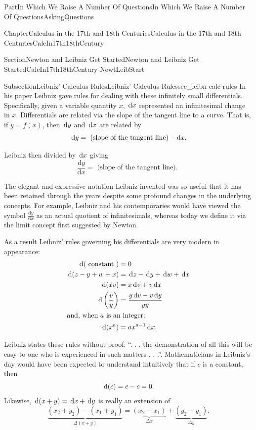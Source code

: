 \documentclass[oneside,10pt,]{book}
\numberwithin{equation}{part}
\newcommand{\dx}[1]{\,{\rm d}#1}
\newcommand{\dfdx}[2]{\frac{\text{d}{#1}}{\text{d}{#2}}}
\newcommand{\amp}{&}
\begin{document}
\begin{partptx}{Part}{In Which We Raise A Number Of Questions}{}{In Which We Raise A Number Of Questions}{}{}{AskingQuestions}
\begin{chapterptx}{Chapter}{Calculus in the 17th and 18th Centuries}{}{Calculus in the 17th and 18th Centuries}{}{}{CalcIn17th18thCentury}
\begin{sectionptx}{Section}{Newton and Leibniz Get Started}{}{Newton and Leibniz Get Started}{}{}{CalcIn17th18thCentury-NewtLeibStart}
\begin{subsectionptx}{Subsection}{Leibniz' Calculus Rules}{}{Leibniz' Calculus Rules}{}{}{sec_leibn-calc-rules}
In his paper Leibniz gave rules for dealing with these infinitely small differentials.  Specifically, given a variable quantity \(x\), \(\dx{x}\) represented an infinitesimal change in \(x\).  Differentials are related via the slope of the tangent line to a curve.  That is, if \(y=f(x)\), then \(\dx{ y}\) and \(\dx{ x}\) are related by%
\begin{equation*}
\dx{ y}=\text{ (slope of the tangent line) } \cdot \dx{ x}\text{.}
\end{equation*}
%
\par
Leibniz then divided by \(\dx{ x}\) giving%
\begin{equation*}
\dfdx{y}{x}= \text{ (slope of the tangent line). }
\end{equation*}
%
\par
{} The elegant and expressive notation Leibniz invented was so useful that it has been retained through the years despite some profound changes in the underlying concepts.  For example, Leibniz and his contemporaries would have viewed the symbol \(\dfdx{y}{x}\) as an actual quotient of infinitesimals, whereas today we define it via the limit concept first suggested by Newton.%
\par
{} As a result Leibniz' rules governing his differentials are very modern in appearance:%
\begin{align*}
\dx{(\text{ constant } )}\amp =0\\
\dx{(z-y+w+x)}\amp =\dx{ z}-\dx{ y}+\dx{ w}+\dx{ x}\\
\dx{(xv)}\amp =x\dx{ v}+v\dx{ x}\\
\dx{\left(\frac{v}{y}\right)}\amp =\frac{y\dx{ v}-v\dx{ y}}{yy}\\
\intertext{and, when \(a\) is an integer:}
\dx{(x^a)}\amp =ax^{a-1}\dx{ x}\text{.}
\end{align*}
%
\par
Leibniz states these rules without proof: ``. . . the demonstration of all this will be easy to one who is experienced in such matters . . .''. Mathematicians in Leibniz's day would have been expected to understand intuitively that if \(c\) is a constant, then%
\begin{equation*}
\dx(c)=c-c=0\text{.}
\end{equation*}
Likewise, \(\dx(x+y)=\dx{x}+\dx{y}\) is really an extension of%
\begin{equation*}
\underbrace{(x_2+y_2)-(x_1+y_1)}_{\Delta
(x+y)}=\underbrace{(x_2-x_1)}_{\Delta
x}+\underbrace{(y_2-y_1)}_{\Delta{y}} \text{.}

\end{equation*}
\end{subsectionptx}
\end{sectionptx}
\end{chapterptx}
\end{partptx}
\end{document}
